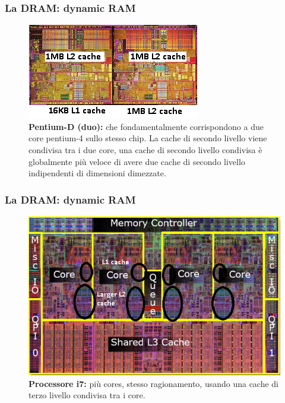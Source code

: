 \begin{frame}
	\frametitle{La DRAM: dynamic RAM}
	 
	\begin{figure}[!htbp] 
		\centering
		\includegraphics[width=0.8\linewidth]{images/5_memory/cache_4.png}
		\caption{\textbf{Pentium-D (duo):} che fondamentalmente corrispondono a due core pentium-4 sullo stesso chip. La cache di secondo livello viene condivisa tra i due core, una cache di secondo livello condivisa è globalmente più veloce di avere due cache di secondo livello indipendenti di dimensioni dimezzate.}
	\end{figure}
	
\end{frame}


\begin{frame}
	\frametitle{La DRAM: dynamic RAM}
	 
	\begin{figure}[!htbp] 
		\centering
		\includegraphics[width=0.8\linewidth]{images/5_memory/cache_5.png}
		\caption{\textbf{Processore i7:} più cores, stesso ragionamento, usando una cache di terzo livello condivisa tra i core.}
	\end{figure}
	
\end{frame}





